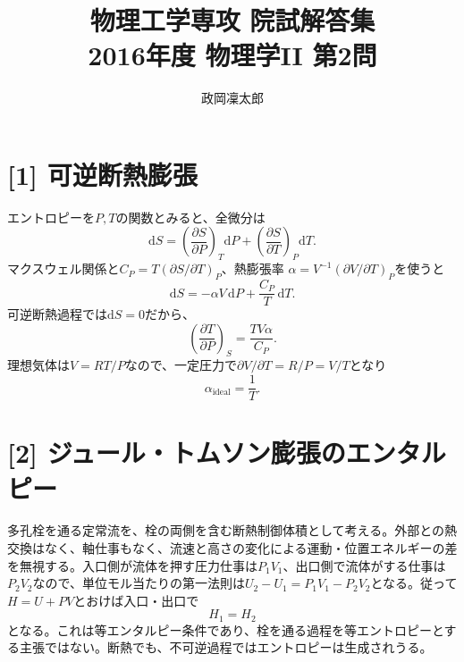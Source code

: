 \documentclass[11pt,a4paper]{article}
\title{物理工学専攻 院試解答集\\2016年度 物理学II 第2問}
\author{政岡凜太郎}
\date{}
\begin{document}
\maketitle

\section*{[1] 可逆断熱膨張}
エントロピーを$P,T$の関数とみると、全微分は
\begin{equation}
  \mathrm dS=\left(\frac{\partial S}{\partial P}\right)_T\mathrm dP
   +\left(\frac{\partial S}{\partial T}\right)_P\mathrm dT.
\end{equation}
マクスウェル関係と$C_P=T(\partial S/\partial T)_P$、熱膨張率
$\alpha=V^{-1}(\partial V/\partial T)_P$を使うと
\begin{equation}
  \mathrm dS=-\alpha V\,\mathrm dP+\frac{C_P}{T}\,\mathrm dT.
\end{equation}
可逆断熱過程では$\mathrm dS=0$だから、
\begin{equation}
  \boxed{\left(\frac{\partial T}{\partial P}\right)_S
  =\frac{TV\alpha}{C_P}}.
\end{equation}
理想気体は$V=RT/P$なので、一定圧力で$\partial V/\partial T=R/P=V/T$となり
\begin{equation}
  \boxed{\alpha_{\mathrm{ideal}}=\frac1T}.
\end{equation}

\section*{[2] ジュール・トムソン膨張のエンタルピー}
多孔栓を通る定常流を、栓の両側を含む断熱制御体積として考える。外部との熱交換はなく、軸仕事もなく、流速と高さの変化による運動・位置エネルギーの差を無視する。入口側が流体を押す圧力仕事は$P_1V_1$、出口側で流体がする仕事は$P_2V_2$なので、単位モル当たりの第一法則は$U_2-U_1=P_1V_1-P_2V_2$となる。従って$H=U+PV$とおけば入口・出口で
\begin{equation}
  H_1=H_2
\end{equation}
となる。これは等エンタルピー条件であり、栓を通る過程を等エントロピーとする主張ではない。断熱でも、不可逆過程ではエントロピーは生成されうる。
\end{document}
